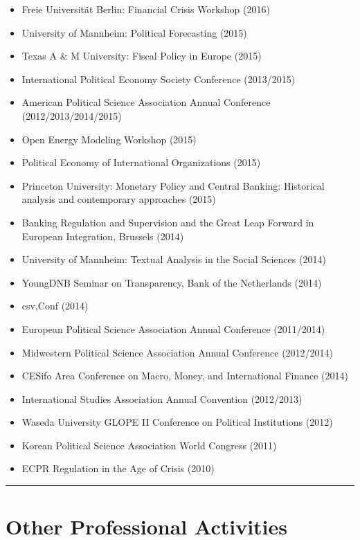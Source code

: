 \documentclass[a4paper]{article}
\begin{document}
{\begin{itemize}
    \item Freie Universit\"{a}t Berlin: Financial Crisis Workshop (2016)
    \item University of Mannheim: Political Forecasting (2015)
    \item Texas A \& M University: Fiscal Policy in Europe (2015)
    \item International Political Economy Society Conference (2013/2015)
    \item American Political Science Association Annual Conference (2012/2013/2014/2015)
    \item Open Energy Modeling Workshop (2015)
    \item Political Economy of International Organizations (2015)
    \item Princeton University: Monetary Policy and Central Banking: Historical analysis and contemporary approaches (2015)
    \item Banking Regulation and Supervision and the Great Leap Forward in European Integration, Brussels (2014)
    \item University of Mannheim: Textual Analysis in the Social Sciences (2014)
    \item YoungDNB Seminar on Transparency, Bank of the Netherlands (2014)
    \item csv,Conf (2014)
    \item European Political Science Association Annual Conference (2011/2014)
    \item Midwestern Political Science Association Annual Conference (2012/2014)
    \item CESifo Area Conference on Macro, Money, and International Finance (2014)
    \item International Studies Association Annual Convention (2012/2013)
    \item Waseda University GLOPE II Conference on Political Institutions (2012)
    \item Korean Political Science Association World Congress (2011)
    \item ECPR Regulation in the Age of Crisis (2010)
\end{itemize}


\vspace{0.25cm}
\medskip\hrule height 1pt
\vspace{0.5cm}

\section*{Other Professional Activities}

}
\end{document}
